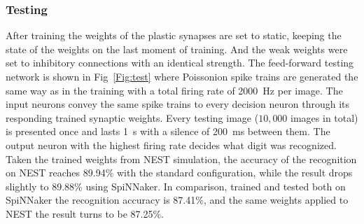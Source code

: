 \subsubsection{Testing}
After training the weights of the plastic synapses are set to static, keeping the state of the weights on the last moment of training.
And the weak weights were set to inhibitory connections with an identical strength.
The feed-forward testing network is shown in Fig~\ref{Fig:test} where Poissonion spike trains are generated the same way as in the training with a total firing rate of 2000~Hz per image.
The input neurons convey the same spike trains to every decision neuron through its responding trained synaptic weights. 
Every testing image ($10,000$ images in total) is presented once and lasts 1~s with a silence of 200~ms between them.
The output neuron with the highest firing rate decides what digit was recognized.
Taken the trained weights from NEST simulation, the accuracy of the recognition on NEST reaches 89.94\% with the standard configuration, while the result drops slightly to 89.88\% using SpiNNaker.
In comparison, trained and tested both on SpiNNaker the recognition accuracy is 87.41\%, and the same weights applied to NEST the result turns to be 87.25\%. 


%
